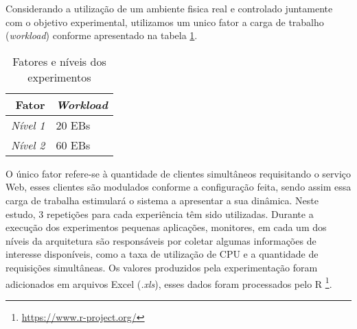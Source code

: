 Considerando a utilização de um ambiente fisica real e controlado juntamente com o objetivo experimental, utilizamos um unico fator a carga de trabalho (\textit{workload}) conforme apresentado na tabela \ref{tab:fatores_niveis}.
\begin{table}[htb]
	\centering
	\caption{Fatores e níveis dos experimentos}
	\label{tab:fatores_niveis}
	\begin{tabularx}{\textwidth}{|r|X|} \hline\hline
		\textbf{Fator}		& \textbf{\textit{Workload}} \\ \hline
		\textit{Nível 1}	&		20 EBs				 \\
		\textit{Nível 2}	&		60 EBs				 \\		
		\hline
	\end{tabularx}
	\fdadospesquisa
\end{table}

O único fator refere-se à quantidade de clientes simultâneos requisitando o serviço Web, esses clientes são modulados conforme a configuração feita, sendo assim essa carga de trabalha estimulará o sistema a apresentar a sua dinâmica. Neste estudo, 3 repetições para cada experiência têm sido utilizadas.
Durante a execução dos experimentos pequenas aplicações, monitores, em cada um dos níveis da arquitetura são responsáveis por coletar algumas informações de interesse disponíveis, como a taxa de utilização de CPU e a quantidade de requisições simultâneas. Os valores produzidos pela experimentação foram adicionados em arquivos Excel (\textit{.xls}), esses dados foram processados pelo R \footnote{\url{https://www.r-project.org/}}.
